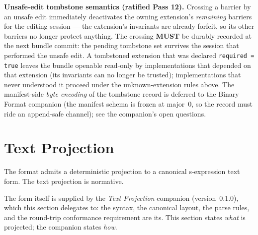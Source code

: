 \documentclass[11pt,letterpaper]{report}
\newcounter{requirement}[chapter]
\newcommand{\MUST}{\textbf{MUST}}
\begin{document}
\begin{requirement}
  \label{req:format:unsafe-tombstone}
  \textbf{Unsafe-edit tombstone semantics (ratified Pass 12).}
  Crossing a barrier by an unsafe edit immediately deactivates the
  owning extension's \emph{remaining} barriers for the editing
  session --- the extension's invariants are already forfeit, so its
  other barriers no longer protect anything. The crossing \MUST{} be
  durably recorded at the next bundle commit: the pending tombstone
  set survives the session that performed the unsafe edit. A
  tombstoned extension that was declared \texttt{required = true}
  leaves the bundle openable read-only by implementations that
  depended on that extension (its invariants can no longer be
  trusted); implementations that never understood it proceed under
  the unknown-extension rules above. The manifest-side \emph{byte
  encoding} of the tombstone record is deferred to the Binary Format
  companion (the manifest schema is frozen at major~0, so the record
  must ride an append-safe channel); see the companion's open
  questions.
\end{requirement}

\section{Text Projection}
\label{sec:format:textproj}

The format admits a deterministic projection to a canonical
s-expression text form. The text projection is normative.

The form itself is supplied by the \emph{Text Projection} companion
(version~0.1.0), which this section delegates to: the syntax, the canonical
layout, the parse rules, and the round-trip conformance requirement are its.
This section states \emph{what} is projected; the companion states \emph{how}.
\end{document}
